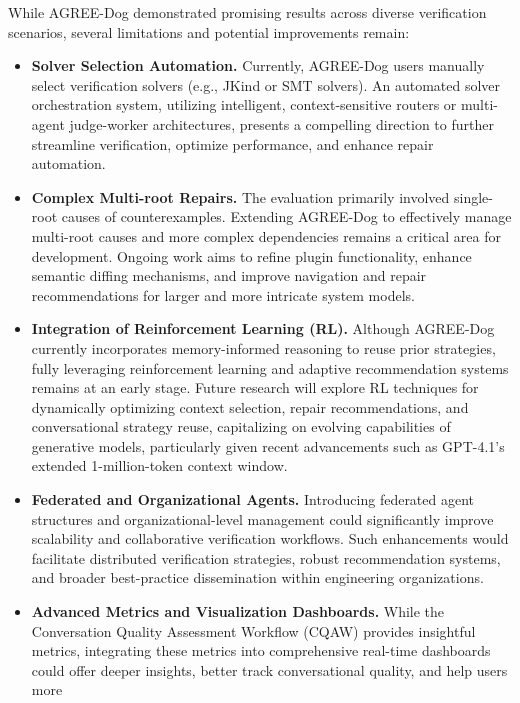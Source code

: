 \label{sec:limitations}

While AGREE-Dog demonstrated promising results across diverse verification scenarios, several limitations and potential improvements remain:

\begin{itemize}
\item \textbf{Solver Selection Automation.} Currently, AGREE-Dog users manually select verification solvers (e.g., JKind or SMT solvers). An automated solver orchestration system, utilizing intelligent, context-sensitive routers or multi-agent judge-worker architectures, presents a compelling direction to further streamline verification, optimize performance, and enhance repair automation.

\item \textbf{Complex Multi-root Repairs.} The evaluation primarily involved single-root causes of counterexamples. Extending AGREE-Dog to effectively manage multi-root causes and more complex dependencies remains a critical area for development. Ongoing work aims to refine plugin functionality, enhance semantic diffing mechanisms, and improve navigation and repair recommendations for larger and more intricate system models.

\item \textbf{Integration of Reinforcement Learning (RL).} Although AGREE-Dog currently incorporates memory-informed reasoning to reuse prior strategies, fully leveraging reinforcement learning and adaptive recommendation systems remains at an early stage. Future research will explore RL techniques for dynamically optimizing context selection, repair recommendations, and conversational strategy reuse, capitalizing on evolving capabilities of generative models, particularly given recent advancements such as GPT-4.1's extended 1-million-token context window.

\item \textbf{Federated and Organizational Agents.} Introducing federated agent structures and organizational-level management could significantly improve scalability and collaborative verification workflows. Such enhancements would facilitate distributed verification strategies, robust recommendation systems, and broader best-practice dissemination within engineering organizations.

\item \textbf{Advanced Metrics and Visualization Dashboards.} While the Conversation Quality Assessment Workflow (CQAW) provides insightful metrics, integrating these metrics into comprehensive real-time dashboards could offer deeper insights, better track conversational quality, and help users more

\end{itemize}